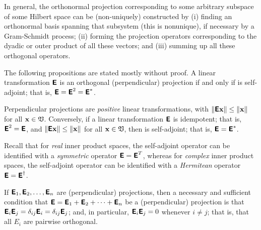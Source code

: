 In general, the orthonormal projection corresponding to some arbitrary subspace of some Hilbert space can be (non-uniquely)
constructed by
(i) finding an orthonormal basis spanning that subsystem (this is nonunique),
if necessary by a Gram-Schmidt process;
(ii) forming the projection operators corresponding to the dyadic or outer product
of all these vectors; and
(iii) summing up all these orthogonal operators.


The following propositions are stated mostly without proof.
A  linear transformation $\textsf{\textbf{E}}$ is an orthogonal (perpendicular) projection
if and only if is self-adjoint; that is,
$\textsf{\textbf{E}} = \textsf{\textbf{E}}^2=\textsf{\textbf{E}}^*$.

Perpendicular projections are {\em positive} linear transformations,
with
$\left\| \textsf{\textbf{E}}{\bf x} \right\| \le \| {\bf x} \|$
for all
${\bf x} \in {\frak V}$.
Conversely,
if a linear transformation $\textsf{\textbf{E}}$
is idempotent; that is,
$\textsf{\textbf{E}}^2=\textsf{\textbf{E}}$,
and  $\left\| \textsf{\textbf{E}}{\bf x} \right\| \le \| {\bf x} \|$
for all
${\bf x} \in {\frak V}$,
then  is self-adjoint; that is,
$\textsf{\textbf{E}}=\textsf{\textbf{E}}^\ast$.

Recall that
for {\em real} inner product spaces, the self-adjoint operator can be identified with a {\em symmetric} operator
$\textsf{\textbf{E}}=\textsf{\textbf{E}}^T$,
whereas
for {\em complex} inner product spaces, the self-adjoint operator can be identified with a {\em Hermitean} operator
$\textsf{\textbf{E}}=\textsf{\textbf{E}}^\dagger$.


If $\textsf{\textbf{E}}_1,\textsf{\textbf{E}}_2, \ldots , \textsf{\textbf{E}}_n$ are (perpendicular)
projections,
then a necessary and sufficient condition that
$\textsf{\textbf{E}} =\textsf{\textbf{E}}_1+\textsf{\textbf{E}}_2+\cdots +\textsf{\textbf{E}}_n$
be a (perpendicular) projection is that
 $\textsf{\textbf{E}}_i \textsf{\textbf{E}}_j =\delta_{ij}\textsf{\textbf{E}}_i =\delta_{ij}\textsf{\textbf{E}}_j$;
and, in particular,
$\textsf{\textbf{E}}_i \textsf{\textbf{E}}_j =0$
whenever $i\neq j$; that is, that all $E_i$ are pairwise orthogonal.

